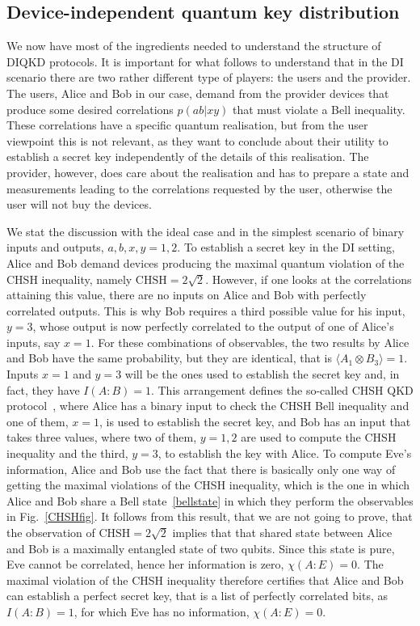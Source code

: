 \documentclass[a4paper]{article}
\begin{document}
\subsection{Device-independent quantum key distribution}

We now have most of the ingredients needed to understand the structure of DIQKD protocols. It is important for what follows to understand that in the DI scenario there are two rather different type of players: the users and the provider. The users, Alice and Bob in our case, demand from the provider devices that produce some desired correlations $p(ab|xy)$ that must violate a Bell inequality. These correlations have a specific quantum realisation, but from the user viewpoint this is not relevant, as they want to conclude about their utility to establish a secret key independently of the details of this realisation. The provider, however, does care about the realisation and has to prepare a state and measurements leading to the correlations requested by the user, otherwise the user will not buy the devices.

We stat the discussion with the ideal case and in the simplest scenario of binary inputs and outputs, $a,b,x,y=1,2$. To establish a secret key in the DI setting, Alice and Bob demand devices producing the maximal quantum violation of the CHSH inequality, namely $\text{CHSH}=2\sqrt 2$. However, if one looks at the correlations attaining this value, there are no inputs on Alice and Bob with perfectly correlated outputs. This is why Bob requires a third possible value for his input, $y=3$, whose output is  now perfectly correlated to the output of one of Alice's inputs, say $x=1$. For these combinations of observables, the two results by Alice and Bob have the same probability, but they are identical, that is $\langle A_1\otimes B_3\rangle=1$. Inputs $x=1$ and $y=3$ will be the ones used to establish the secret key and, in fact, they have $I(A:B)=1$. This arrangement defines the so-called CHSH QKD protocol~\cite{diqkd}, where Alice has a binary input to check the CHSH Bell inequality and one of them, $x=1$, is used to establish the secret key, and Bob has an input that takes three values, where two of them, $y=1,2$ are used to compute the CHSH inequality and the third, $y=3$, to establish the key with Alice. To compute Eve's information, Alice and Bob use the fact that there is basically only one way of getting the maximal violations of the CHSH inequality, which is the one in which Alice and Bob share a Bell state~\eqref{bellstate} in which they perform the observables in Fig.~\ref{CHSHfig}. It follows from this result, that we are not going to prove, that the observation of $\text{CHSH}=2\sqrt 2$ implies that that shared state between Alice and Bob is a maximally entangled state of two qubits. Since this state is pure, Eve cannot be correlated, hence her information is zero, $\chi(A:E)=0$. The maximal violation of the CHSH inequality therefore certifies that Alice and Bob can establish a perfect secret key, that is a list of perfectly correlated bits, as $I(A:B)=1$, for which Eve has no information, $\chi(A:E)=0$.
\end{document}
